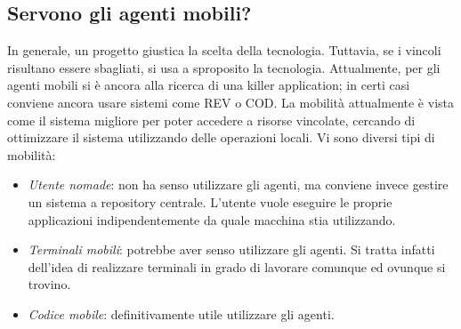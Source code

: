 \subsection{Servono gli agenti mobili?}
In generale, un progetto giustica la scelta della tecnologia. Tuttavia, se i vincoli risultano essere sbagliati, si usa
a sproposito la tecnologia.
Attualmente, per gli agenti mobili si è ancora alla ricerca di una killer application; in certi casi conviene ancora
usare sistemi come REV o COD. La mobilità attualmente è vista come il sistema migliore per poter accedere a risorse
vincolate, cercando di ottimizzare il sistema utilizzando delle operazioni locali. Vi sono diversi tipi di mobilità:
\begin{itemize}
 \item \textit{Utente nomade}: non ha senso utilizzare gli agenti, ma conviene invece gestire un sistema a repository
centrale.  L'utente vuole eseguire le proprie applicazioni indipendentemente da quale macchina stia utilizzando.
 \item \textit{Terminali mobili}: potrebbe aver senso utilizzare gli agenti. Si tratta infatti dell'idea di realizzare
 terminali in grado di lavorare comunque ed ovunque si trovino.
 \item \textit{Codice mobile}: definitivamente utile utilizzare gli agenti.
\end{itemize}
